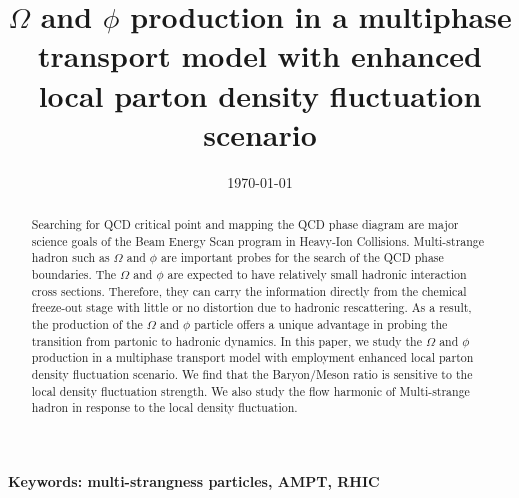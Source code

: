 \documentclass[twocolumn,aps,prc,showpacs,superscriptaddress,preprintnumbers,floatfix,nofootinbib]{revtex4}
\begin{document}
\begin{CJK*}{GBK}{song}
  \title{$\Omega$ and $\phi$ production in a multiphase transport model with enhanced local parton density fluctuation scenario}

  \date{\today}

  \begin{abstract}
    Searching for QCD critical point and mapping the QCD phase diagram are major science
    goals of the Beam Energy Scan program in Heavy-Ion Collisions. Multi-strange hadron
    such as $\Omega$ and $\phi$ are important probes for the search of the QCD phase
    boundaries. The $\Omega$ and $\phi$ are expected to have relatively small hadronic
    interaction cross sections. Therefore, they can carry the information directly from the
    chemical freeze-out stage with little or no distortion due to hadronic rescattering. As a
    result, the production of the $\Omega$ and $\phi$ particle offers a unique advantage in
    probing the transition from partonic to hadronic dynamics. In this paper, we study the
    $\Omega$ and $\phi$ production in a multiphase transport model with employment enhanced
    local parton density fluctuation scenario. We find that the Baryon/Meson ratio is
    sensitive to the local density fluctuation strength. We also study the flow harmonic of
    Multi-strange hadron in response to the local density fluctuation.
  \end{abstract}


  \maketitle
  \textbf{Keywords: multi-strangness particles, AMPT, RHIC}




\end{CJK*}
\end{document}
